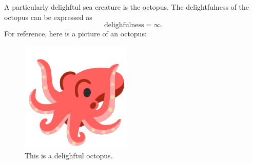 
A particularly delighftul sea creature is the octopus.
The delightfulness of the octopus can be expressed as
\begin{equation}
  \text{delighfulness} = \infty. \label{equation} %
\end{equation}
For reference, here is a picture of an octopus:
\begin{figure}
  \begin{centering}
  \includegraphics[width=0.8\columnwidth]{octopus.pdf}
  \par\end{centering}
  \caption{This is a delighftul octopus.}
  \label{figure} %
\end{figure}
